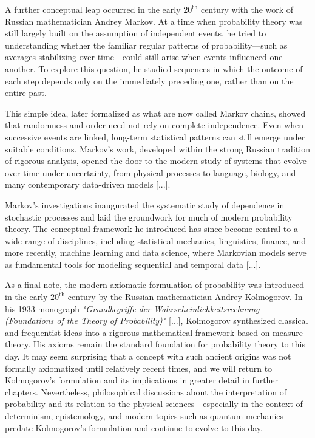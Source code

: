 \medskip

A further conceptual leap occurred in the early $20^{\text{th}}$ century with the work of Russian mathematician Andrey Markov. At a time when probability theory was still largely built on the assumption of independent events, he tried to understanding whether the familiar regular patterns of probability—such as averages stabilizing over time—could still arise when events influenced one another. To explore this question, he studied sequences in which the outcome of each step depends only on the immediately preceding one, rather than on the entire past.

This simple idea, later formalized as what are now called Markov chains, showed that randomness and order need not rely on complete independence. Even when successive events are linked, long-term statistical patterns can still emerge under suitable conditions. Markov’s work, developed within the strong Russian tradition of rigorous analysis, opened the door to the modern study of systems that evolve over time under uncertainty, from physical processes to language, biology, and many contemporary data-driven models [...].

Markov’s investigations inaugurated the systematic study of dependence in stochastic processes and laid the groundwork for much of modern probability theory. The conceptual framework he introduced has since become central to a wide range of disciplines, including statistical mechanics, linguistics, finance, and more recently, machine learning and data science, where Markovian models serve as fundamental tools for modeling sequential and temporal data [...].

\medskip

As a final note, the modern axiomatic formulation of probability was introduced in the early $20^{\text{th}}$ century by the Russian mathematician Andrey Kolmogorov. In his 1933 monograph \textit{"Grundbegriffe der Wahrscheinlichkeitsrechnung (Foundations of the Theory of Probability)"} [...], Kolmogorov synthesized classical and frequentist ideas into a rigorous mathematical framework based on measure theory. His axioms remain the standard foundation for probability theory to this day. It may seem surprising that a concept with such ancient origins was not formally axiomatized until relatively recent times, and we will return to Kolmogorov’s formulation and its implications in greater detail in further chapters. Nevertheless, philosophical discussions about the interpretation of probability and its relation to the physical sciences—especially in the context of determinism, epistemology, and modern topics such as quantum mechanics—predate Kolmogorov's formulation and continue to evolve to this day.
